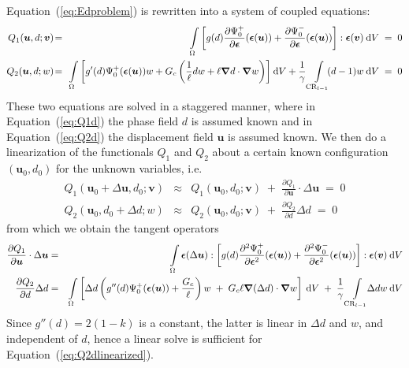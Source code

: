 \documentclass{article}
\def\deriv#1#2{\frac{\partial#1}{\partial#2}}
\def\dderiv#1#2{\frac{\partial^2#1}{\partial#2^2}}
\def\dV{\:{\rm d}V}
\begin{document}
Equation~(\ref{eq:Edproblem}) is rewritten into a system of coupled equations:
%
\begin{eqnarray}
  \label{eq:Q1d}
  Q_1(\bm{u},d;\bm{v})\! &=& \!\!\int\limits_\Omega \left[
    g(d)\deriv{\Psi_0^+}{\bm{\epsilon}}(\bm{\epsilon}(\bm{u})) +
        \deriv{\Psi_0^-}{\bm{\epsilon}}(\bm{\epsilon}(\bm{u}))
        \right] : \bm{\epsilon}(\bm{v})\dV \;=\; 0 \\
  \label{eq:Q2d}
  Q_2(\bm{u},d;w)\! &=& \!\!\int\limits_\Omega \left[
    g'(d)\Psi_0^+(\bm{\epsilon}(\bm{u}))w + G_c\left(
    \frac{1}{\ell}dw + \ell\bm{\nabla}d\cdot\bm{\nabla}w
    \right)\right]\!\dV + \frac{1}{\gamma}\int\limits_{{\rm CR}_{l-1}}\!\!(d-1)w \dV
  \;=\; 0
\end{eqnarray}
%
These two equations are solved in a staggered manner,
where in Equation~(\ref{eq:Q1d}) the phase field $d$ is assumed known and in
Equation~(\ref{eq:Q2d}) the displacement field $\bm{u}$ is assumed known.
We then do a linearization of the functionals $Q_1$ and $Q_2$ about a certain
known configuration $(\bm{u}_0,d_0)$ for the unknown variables, i.e.
%
\begin{eqnarray}
  \label{eq:Q1dlinearized}
  Q_1(\bm{u}_0+\Delta\bm{u},d_0;\bm{v}) &\approx&
  Q_1(\bm{u}_0,d_0;\bm{v}) \;+\; \deriv{Q_1}{\bm{u}}\cdot\Delta\bm{u} \;=\; 0 \\
  \label{eq:Q2dlinearized}
  Q_2(\bm{u}_0,d_0+\Delta d;w) &\approx&
  Q_2(\bm{u}_0,d_0;\bm{v}) \;+\; \deriv{Q_2}{d}\Delta d\;=\; 0
\end{eqnarray}
%
from which we obtain the tangent operators
%
\begin{eqnarray}
  \label{eq:Q1dtangent}
  \deriv{Q_1}{\bm{u}}\cdot\Delta\bm{u} &=&
  \int\limits_\Omega \bm{\epsilon}(\Delta\bm{u}) : \left[
    g(d)\dderiv{\Psi_0^+}{\bm{\epsilon}}(\bm{\epsilon}(\bm{u})) +
        \dderiv{\Psi_0^-}{\bm{\epsilon}}(\bm{\epsilon}(\bm{u}))
    \right] : \bm{\epsilon}(\bm{v})\dV \\
  \label{eq:Q2dtangent}
  \deriv{Q_2}{d}\Delta d &=&
  \int\limits_\Omega \left[ \Delta d \left(
    g''(d)\Psi_0^+(\bm{\epsilon}(\bm{u})) + \frac{G_c}{\ell} \right) w \;+\;
    G_c\ell\bm{\nabla}(\Delta d)\cdot\bm{\nabla}w \right] \dV \;+\;
    \frac{1}{\gamma}\int\limits_{{\rm CR}_{l-1}}\!\!\Delta dw \dV
\end{eqnarray}
%
Since $g''(d)=2(1-k)$ is a constant, the latter is linear in $\Delta d$ and $w$,
and independent of $d$, hence a linear solve is sufficient for
Equation~(\ref{eq:Q2dlinearized}).



\end{document}

